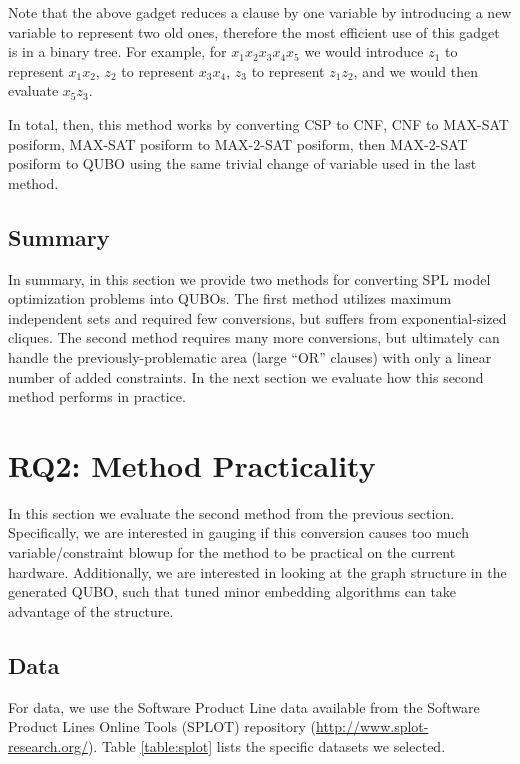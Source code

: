 \documentclass{sig-alternate-05-2015}
\begin{document}
Note that the above gadget reduces a clause by one variable by introducing a new variable to represent two old ones, therefore the most efficient use of this gadget is in a binary tree. For example, for $x_1 x_2  x_3  x_4 x_5$ we would introduce $z_1$ to represent $x_1 x_2$, $z_2$ to represent $x_3 x_4$, $z_3$ to represent $z_1 z_2$, and we would then evaluate $x_5 z_3$.

In total, then, this method works by converting CSP to CNF, CNF to MAX-SAT posiform, MAX-SAT posiform to MAX-2-SAT posiform, then MAX-2-SAT posiform to QUBO using the same trivial change of variable used in the last method.

\subsection{Summary}

In summary, in this section we provide two methods for converting SPL model optimization problems into QUBOs. The first method utilizes maximum independent sets and required few conversions, but suffers from exponential-sized cliques. The second method requires many more conversions, but ultimately can handle the previously-problematic area (large ``OR'' clauses) with only a linear number of added constraints. In the next section we evaluate how this second method performs in practice.


\section{RQ2: Method Practicality}

In this section we evaluate the second method from the previous section. Specifically, we are interested in gauging if this conversion causes too much variable/constraint blowup for the method to be practical on the current hardware. Additionally, we are interested in looking at the graph structure in the generated QUBO, such that tuned minor embedding algorithms can take advantage of the structure.

\subsection{Data}
For data, we use the Software Product Line data available from the Software Product Lines Online Tools (SPLOT) repository (\url{http://www.splot-research.org/}). Table \ref{table:splot} lists the specific datasets we selected.
\end{document}
